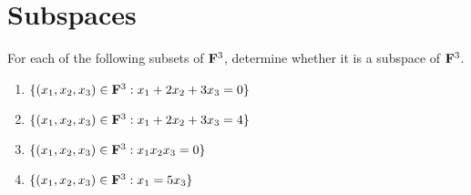\section{Subspaces}

\begin{exercise}
    For each of the following subsets of $\mathbf{F}^3$, determine whether it is a subspace of $\mathbf{F}^3$.
    \begin{enumerate}[label=(\alph*)]
        \item $\{(x_1,x_2,x_3)\in \mathbf{F}^3 : x_1 + 2x_2 + 3x_3  = 0\}$
        \item $\{(x_1,x_2,x_3)\in \mathbf{F}^3 : x_1 + 2x_2 + 3x_3  = 4\}$
        \item $\{(x_1,x_2,x_3)\in \mathbf{F}^3 : x_1 x_2 x_3  = 0\}$
        \item $\{(x_1,x_2,x_3)\in \mathbf{F}^3 : x_1 = 5x_3\}$\\
    \end{enumerate}
\end{exercise}

